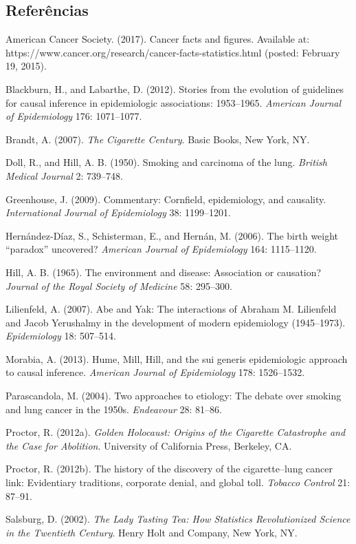 \documentclass[11pt,a5paper,twoside]{book}
\begin{document}
\subsection{Referências}
American Cancer Society. (2017). Cancer facts and figures. Available at: https://www.cancer.org/research/cancer-facts-statistics.html (posted: February 19, 2015).

Blackburn, H., and Labarthe, D. (2012). Stories from the evolution of guidelines for causal inference in epidemiologic associations: 1953–1965. \textit{American Journal of Epidemiology} 176: 1071–1077.

Brandt, A. (2007). \textit{The Cigarette Century}. Basic Books, New York, NY.

Doll, R., and Hill, A. B. (1950). Smoking and carcinoma of the lung. \textit{British Medical Journal} 2: 739–748.

Greenhouse, J. (2009). Commentary: Cornfield, epidemiology, and causality. \textit{International Journal of Epidemiology} 38: 1199–1201.

Hernández-Díaz, S., Schisterman, E., and Hernán, M. (2006). The birth weight “paradox” uncovered? \textit{American Journal of Epidemiology} 164: 1115–1120.

Hill, A. B. (1965). The environment and disease: Association or causation? \textit{Journal of the Royal Society of Medicine} 58: 295–300.

Lilienfeld, A. (2007). Abe and Yak: The interactions of Abraham M. Lilienfeld and Jacob Yerushalmy in the development of modern epidemiology (1945–1973). \textit{Epidemiology} 18: 507–514.

Morabia, A. (2013). Hume, Mill, Hill, and the sui generis epidemiologic approach to causal inference. \textit{American Journal of Epidemiology} 178: 1526–1532.

Parascandola, M. (2004). Two approaches to etiology: The debate over smoking and lung cancer in the 1950s. \textit{Endeavour} 28: 81–86.

Proctor, R. (2012a). \textit{Golden Holocaust: Origins of the Cigarette Catastrophe and the Case for Abolition}. University of California Press, Berkeley, CA.

Proctor, R. (2012b). The history of the discovery of the cigarette–lung cancer link: Evidentiary traditions, corporate denial, and global toll. \textit{Tobacco Control} 21: 87–91.

Salsburg, D. (2002). \textit{The Lady Tasting Tea: How Statistics Revolutionized Science in the Twentieth Century}. Henry Holt and Company, New York, NY.
\end{document}
